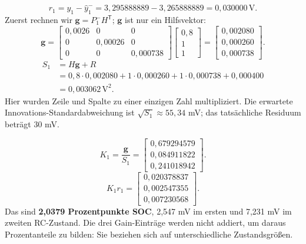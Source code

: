 \[
r_1=y_1-\hat y_1^-=3{,}295888889-3{,}265888889=0{,}030000\,\mathrm V.
\]
Zuerst rechnen wir $\mathbf g=P_1^-H^{\mathsf T}$; $\mathbf g$ ist nur ein Hilfsvektor:
\[
\mathbf g=
\begin{bmatrix}0{,}0026&0&0\\0&0{,}00026&0\\0&0&0{,}000738\end{bmatrix}
\begin{bmatrix}0{,}8\\1\\1\end{bmatrix}
=\begin{bmatrix}0{,}002080\\0{,}000260\\0{,}000738\end{bmatrix}.
\]
\[
\begin{aligned}
S_1&=H\mathbf g+R\\
&=0{,}8\cdot0{,}002080+1\cdot0{,}000260+1\cdot0{,}000738+0{,}000400\\
&=\boxed{0{,}003062\,\mathrm V^2}.
\end{aligned}
\]
Hier wurden Zeile und Spalte zu einer einzigen Zahl multipliziert. Die erwartete Innovations-Standardabweichung ist $\sqrt{S_1}\approx55{,}34$ mV; das tatsächliche Residuum beträgt 30 mV.

\[
\boxed{K_1=\frac{\mathbf g}{S_1}
=\begin{bmatrix}0{,}679294579\\0{,}084911822\\0{,}241018942\end{bmatrix}.}
\]
\[
K_1r_1=\begin{bmatrix}0{,}020378837\\0{,}002547355\\0{,}007230568\end{bmatrix}.
\]
Das sind \textbf{2,0379 Prozentpunkte SOC}, 2,547 mV im ersten und 7,231 mV im zweiten RC-Zustand. Die drei Gain-Einträge werden nicht addiert, um daraus Prozentanteile zu bilden: Sie beziehen sich auf unterschiedliche Zustandsgrößen.

